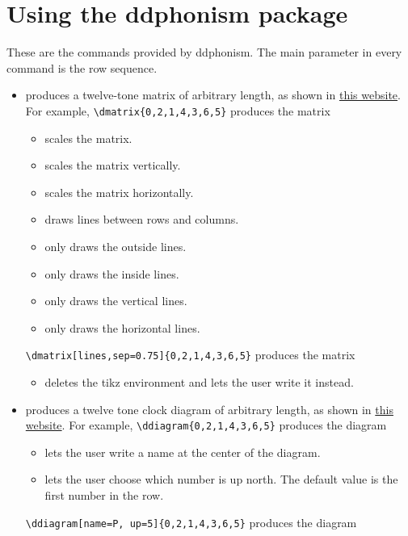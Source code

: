 \documentclass{article}
\begin{document}
	\section{Using the \textsf{ddphonism} package}
	These are the commands provided by \textsf{ddphonism}. The main parameter in every command is the row sequence.
	
	\newcommand{\I}[1]{\item[\texttt{$\backslash$#1}]\quad}	
	\newcommand{\Ii}[1]{\item[\textsf{#1}]\quad}
	\begin{itemize}
		\I{dmatrix} produces a twelve-tone matrix of arbitrary length, as shown in \href{https:matrices.netlify.com}{this website}. For example, \verb|| produces the matrix \dmatrix{0,2,1,4,3,6,5}

		\begin{itemize}
			\Ii{sep} scales the matrix.
			\Ii {vsep} scales the matrix vertically.
			\Ii {hsep} scales the matrix horizontally.
			\Ii{lines} draws lines between rows and columns.
			\Ii{outside lines} only draws the outside lines.
			\Ii{inside lines} only draws the inside lines.
			\Ii{vlines lines} only draws the vertical lines.
			\Ii{hlines lines} only draws the horizontal lines.
		\end{itemize}
		\verb|\dmatrix[lines,sep=0.75]{0,2,1,4,3,6,5}| produces the matrix
		
		
		\begin{itemize}
			\Ii{no tikz} deletes the tikz environment and lets the user write it instead.
		\end{itemize}
		
		\I{ddiagram} produces a twelve tone clock diagram of arbitrary length, as shown in \href{https:diagramas.netlify.com}{this website}. For example, \verb|\ddiagram{0,2,1,4,3,6,5}| produces the diagram\\ 
		
		\begin{itemize}
			\Ii{name} lets the user write a name at the center of the diagram.
			\Ii{up} lets the user choose which number is up north. The default value is the first number in the row.
		\end{itemize}
		
		\verb|\ddiagram[name=P, up=5]{0,2,1,4,3,6,5}| produces the diagram\\
		

\end{itemize}
\end{document}
